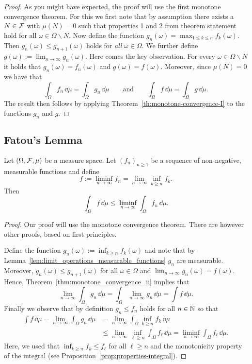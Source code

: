 \begin{proof}
As you might have expected, the proof will use the first monotone convergence theorem. For this we first note that by assumption there exists a $N \in \mathcal F$ with $\mu(N) = 0$ such that properties 1 and 2 from theorem statement hold for all $\omega \in \Omega \backslash N$. Now define the function $g_n(\omega) = \max_{1 \le k \le n} f_k(\omega)$. Then $g_n(\omega) \le g_{n+1}(\omega)$ holds for \emph{all} $\omega \in \Omega$. We further define $g(\omega) := \lim_{n \to \infty} g_n(\omega)$. Here comes the key observation. For every $\omega \in \Omega\backslash N$ it holds that $g_n(\omega) = f_n(\omega)$ and $g(\omega) = f(\omega)$. Moreover, since $\mu(N) = 0$ we have that
\[
	\int_\Omega f_n \, \dd \mu = \int_\Omega g_n \, \dd \mu \qquad \text{and} \qquad
	\int_\Omega f \, \dd \mu = \int_\Omega g \, \dd \mu.
\]
The result then follows by applying Theorem~\ref{th:monotone-convergence-I} to the functions $g_n$ and $g$.
\end{proof}

\subsection{Fatou's Lemma}

\begin{theorem}\label{thm:fatou}
Let $(\Omega, \mathcal F, \mu)$ be a measure space. Let $(f_n)_{n \ge 1}$ be a sequence of non-negative, measurable functions and define
\[
	f := \liminf_{n\to \infty} f_n = \lim_{n \to \infty} \inf_{k \ge n} f_k.
\]
Then
\[
	\int_\Omega f\, \dd \mu \le \liminf_{n\to \infty} \int_\Omega f_n \,\dd \mu.
\]
\end{theorem}

\begin{proof}
Our proof will use the monotone convergence theorem. There are however other proofs, based on first principles. 

Define the function $g_n(\omega) := \inf_{k \ge n} f_k(\omega)$ and note that by Lemma~\ref{lem:limit_operations_measurable_functions} $g_n$ are measurable. Moreover, $g_n(\omega) \le g_{n+1}(\omega)$ for all $\omega \in \Omega$ and $\lim_{n \to \infty} g_n(\omega) = f(\omega)$. Hence, Theorem~\ref{thm:monotone_convergence_ii} implies that
\[
	\lim_{n \to \infty} \int_\Omega g_n \, \dd \mu = \int_\Omega \lim_{n \to \infty} g_n \, \dd \mu
	= \int f \, \dd \mu. 
\]
Finally we observe that by definition $g_n \le f_n$ holds for all $n \in \mathbb N$ so that
\begin{align*}
	\int f \, \dd \mu = \lim_{n \to \infty} \int_\Omega g_n \, \dd \mu
	&= \lim_{n \to \infty} \int_\Omega \inf_{k \ge n} f_k \, \dd \mu \\
	&\le \lim_{n \to \infty} \inf_{\ell \ge n} \int_\Omega  f_\ell \, \dd \mu
	= \liminf_{n \to \infty} \int_\Omega  f_\ell \, \dd \mu.
\end{align*}
Here, we used that $\inf_{k \ge n} f_k \le f_\ell$ for all $\ell \ge n$ and the monotonicity property of the integral (see Proposition~\ref{prop:properties-integral}).
\end{proof}

